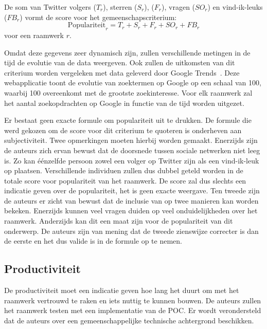 De som van Twitter volgers ($T_r$), \gh{} sterren ($S_r$), \gh{}  ($F_r$), \so{} vragen ($SO_r$) en \fb{} vind-ik-leuks ($FB_r$) vormt de score voor het gemeenschapscriterium:
\begin{equation}
  \text{Populariteit}_r=T_r+S_r+F_r+SO_r+FB_r
  \label{eq:populariteit}
\end{equation}
voor een raamwerk $r$.

Omdat deze gegevens zeer dynamisch zijn, zullen verschillende metingen in de tijd de evolutie van de data weergeven.
Ook zullen de uitkomsten van dit criterium worden vergeleken met data geleverd door Google Trends~\cite{Google2012a}.
Deze webapplicatie toont de evolutie van zoektermen op Google op een schaal van 100, waarbij 100 overeenkomt met de grootste zoekinteresse.
Voor elk raamwerk zal het aantal zoekopdrachten op Google in functie van de tijd worden uitgezet.

Er bestaat geen exacte formule om populariteit uit te drukken.
De formule die werd gekozen om de score voor dit criterium te quoteren is onderheven aan subjectiviteit.
Twee opmerkingen moeten hierbij worden gemaakt.
Enerzijds zijn de auteurs zich ervan bewust dat de doorsnede tussen sociale netwerken niet leeg is.
Zo kan éénzelfde persoon zowel een volger op Twitter zijn als een vind-ik-leuk op \fb{} plaatsen.
Verschillende individuen zullen dus dubbel geteld worden in de totale score voor populariteit van het raamwerk.
De score zal dus slechts een indicatie geven over de populariteit,  het is geen exacte weergave.
Ten tweede zijn de auteurs er zicht van bewust dat de inclusie van \so{} op twee manieren kan worden bekeken.
Enerzijds kunnen veel vragen duiden op veel onduidelijkheden over het raamwerk.
Anderzijds kan dit een maat zijn voor de populariteit van dit onderwerp.
De auteurs zijn van mening dat de tweede zienswijze correcter is dan de eerste en het dus valide is \so{} in de formule op te nemen.


\subsection{Productiviteit}
\label{sec:vergelijking-productiviteit}
De productiviteit moet een indicatie geven hoe lang het duurt om met het raamwerk vertrouwd te raken en iets nuttig te kunnen bouwen.
De auteurs zullen het raamwerk testen met een implementatie van de POC.
Er wordt verondersteld dat de auteurs over een gemeenschappelijke technische achtergrond beschikken.

